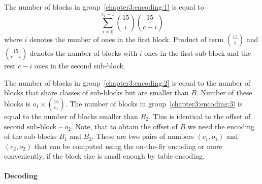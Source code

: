 The number of blocks in group~\ref{chapter3:encoding:1} is equal to
$$\sum_{i=0}^{c_1-1} {15\choose i} {15\choose c-i}$$ where $i$ denotes the number
of ones in the first block. Product of term ${15\choose i}$ and ${15\choose c-i}$
denotes the number of blocks with $i$-ones in the first sub-block and the rest
$c-i$ ones in the second sub-block.

The number of blocks in group~\ref{chapter3:encoding:2} is equal to the number of blocks that
share classes of sub-blocks but are smaller than $B$. Number of these blocks is $o_1\times {15\choose c_1}$.
The number of blocks in group~\ref{chapter3:encoding:3} is equal to the number of blocks smaller 
than $B_2$. This is identical to the offset of second sub-block -- $o_2$. Note, that to obtain the
offset of $B$ we need the encoding of the sub-blocks $B_1$ and $B_2$. These are two pairs of numbers
$(c_1, o_1)$ and $(c_2, o_2)$ that can be computed using the on-the-fly encoding or more conveniently,
if the block size is small enough by table encoding.

\paragraph{Decoding}

